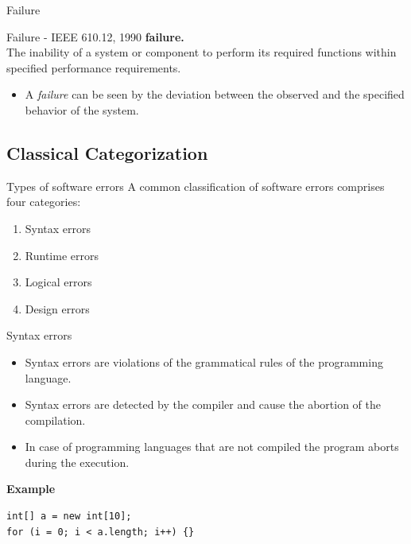 \begin{frame}{Failure}
\begin{block}{Failure - IEEE 610.12, 1990}
\textbf{failure.}\\ The inability of a system or component to perform its required functions within specified performance requirements.
\end{block}

\begin{itemize}
	\item A \emph{failure} can be seen by the deviation between the observed and the specified behavior of the system.
\end{itemize}

\end{frame}

\subsection{Classical Categorization}

\begin{frame}{Types of software errors}
A common classification of software errors comprises four categories:
\begin{enumerate}
	\item Syntax errors
	\item Runtime errors
	\item Logical errors
	\item Design errors
\end{enumerate}
\end{frame}

\begin{frame}[fragile]{Syntax errors}
\begin{itemize}
	\item Syntax errors are violations of the grammatical rules of the programming language.
	\item Syntax errors are detected by the compiler and cause the abortion of the compilation.
	\item In case of programming languages that are not compiled the program aborts during the execution.
\end{itemize}
\textbf{Example}
\begin{lstlisting}
int[] a = new int[10];
for (i = 0; i < a.length; i++) {}
\end{lstlisting}
\end{frame}

